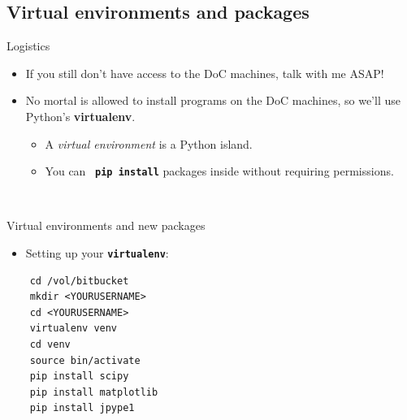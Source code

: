 \documentclass[xcolor=x11names, compress,handout]{beamer}
\renewcommand{\(}{\begin{columns}}
\renewcommand{\)}{\end{columns}}
\newcommand{\<}[1]{\begin{column}{#1}}
\renewcommand{\>}{\end{column}}
\newcommand{\ver}[1]{\texttt{\textbf{#1}}}
\begin{document}
\subsection{Virtual environments and packages}
\begin{frame}{Logistics}

  \large

  \vfill

  \begin{itemize}
     
    \item If you still don't have access to the DoC machines, talk with me ASAP!

  \vfill

    \item No mortal is allowed to install programs on the DoC machines, so we'll
  use Python's \textbf{virtualenv}.

  \begin{itemize}
    \item A \emph{virtual environment} is a Python island.
    \item You can~ \ver{pip install} packages inside without requiring permissions.
  \end{itemize}

  \end{itemize}

  \vfill
  ~
  \vfill

\end{frame}

\begin{frame}[fragile]{Virtual environments and new packages}

  \begin{itemize}
    \item Setting up your \ver{virtualenv}:
  \end{itemize}
  \begin{verbatim}
    cd /vol/bitbucket
    mkdir <YOURUSERNAME>
    cd <YOURUSERNAME>
    virtualenv venv
    cd venv
    source bin/activate
    pip install scipy
    pip install matplotlib
    pip install jpype1
  \end{verbatim}

\end{frame}
\end{document}
